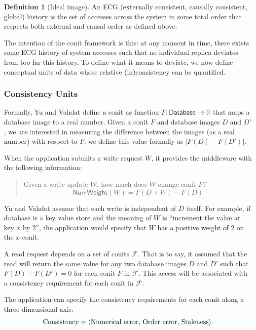 \documentclass[]             %
{NASA}                       %
\theoremstyle{definition}
\newtheorem{definition}[theorem]{Definition}
\begin{document}
\begin{definition}[Ideal image]
  An ECG (externally consistent, causally consistent, global) history
  is the set of accesses across the system in some total order that
  respects both external and causal order as defined above.
\end{definition}

The intention of the conit framework is this: at any moment in time,
there exists some ECG history of system accesses such that no
individual replica deviates from too far this history. To define what
it means to deviate, we now define conceptual units of data whose
relative (in)consistency can be quantified.

\subsubsection{Consistency Units}
\label{ssec:consistency-units}

Formally, Yu and Vahdat define a conit as function
$F\colon \mathsf{Database} \to \mathbb{R}$ that maps a database image
to a real number. Given a conit $F$ and database images $D$ and $D'$,
we are interested in measuring the difference between the images (as a
real number) with respect to $F$; we define this value formally as
$|F(D) - F(D')|$.

When the application submits a write request $W$, it provides the
middleware with the following information:
\begin{quote}
  Given a write update $W$, how much does $W$ change conit $F$?
  \[ \mathsf{NumWeight}\left(W\right) = F(D + W) - F(D) \]
\end{quote}
Yu and Vahdat assume that each write is independent of $D$ itself. For
example, if database is a key value store and the meaning of $W$ is
``increment the value at key $x$ by $2$'', the application would
specify that $W$ has a positive weight of $2$ on the $x$ conit.

A read request depends on a set of conits $\mathcal{F}$. That is to
say, it assumed that the read will return the same value for any two
database images $D$ and $D'$ such that $F(D) - F(D') = 0$ for each
conit $F$ in $\mathcal{F}$. This access will be associated with a
consistency requirement for each conit in $\mathcal{F}$.

The application can specify the consistency requirements for each
conit along a three-dimensional axis:
\[\textrm{Consistency} = \langle \textrm{Numerical error,
    \textrm{Order error}, \textrm{Staleness}} \rangle.\]
\end{document}
